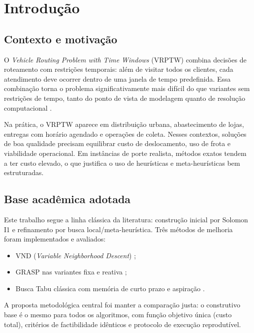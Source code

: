 \section{Introdução}
\label{sec:introducao}

\subsection{Contexto e motivação}

O \emph{Vehicle Routing Problem with Time Windows} (VRPTW) combina decisões de roteamento com restrições temporais: além de visitar todos os clientes, cada atendimento deve ocorrer dentro de uma janela de tempo predefinida. Essa combinação torna o problema significativamente mais difícil do que variantes sem restrições de tempo, tanto do ponto de vista de modelagem quanto de resolução computacional \cite{toth2002vehicle,braysy2005vehicle}.

Na prática, o VRPTW aparece em distribuição urbana, abastecimento de lojas, entregas com horário agendado e operações de coleta. Nesses contextos, soluções de boa qualidade precisam equilibrar custo de deslocamento, uso de frota e viabilidade operacional. Em instâncias de porte realista, métodos exatos tendem a ter custo elevado, o que justifica o uso de heurísticas e meta-heurísticas bem estruturadas.

\subsection{Base acadêmica adotada}

Este trabalho segue a linha clássica da literatura: construção inicial por Solomon I1 \cite{solomon1987algorithms} e refinamento por busca local/meta-heurística. Três métodos de melhoria foram implementados e avaliados:
\begin{itemize}
  \item VND (\emph{Variable Neighborhood Descent}) \cite{hansen2001variable};
  \item GRASP nas variantes fixa e reativa \cite{feo1995greedy,resende2003greedy,prais2000reactive};
  \item Busca Tabu clássica com memória de curto prazo e aspiração \cite{glover1989tabu,glover1990tabu}.
\end{itemize}

A proposta metodológica central foi manter a comparação justa: o construtivo base é o mesmo para todos os algoritmos, com função objetivo única (custo total), critérios de factibilidade idênticos e protocolo de execução reprodutível.

